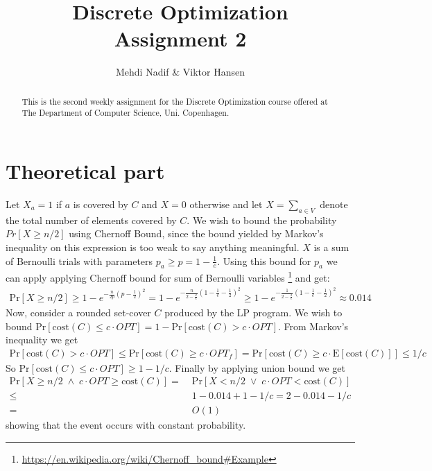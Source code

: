 \documentclass[12pt]{article}
\begin{document}
\nocite{*}


\title{Discrete Optimization \\
       Assignment 2}

\author{Mehdi Nadif \& Viktor Hansen}

\maketitle

\begin{abstract}
  This is the second weekly assignment for the Discrete Optimization course offered at The Department of Computer Science, Uni. Copenhagen.
\end{abstract}

\pagebreak

\section*{Theoretical part}
Let $X_a = 1$ if $a$ is covered by $C$ and $X=0$ otherwise and let $X=\sum_{a \in V}$ denote the total number of elements covered by $C$. We wish to bound the probability $Pr\left[ X \geq n/2 \right]$ using Chernoff Bound, since the bound yielded by Markov's inequality on this expression is too weak to say anything meaningful. $X$ is a sum of Bernoulli trials with parameters $p_a  \geq p =  1-\frac{1}{e}$. Using this bound for $p_a$ we can apply applying Chernoff bound for sum of Bernoulli variables \footnote{\url{https://en.wikipedia.org/wiki/Chernoff_bound\#Example}} and get:
\begin{align*}
\text{Pr}[X \geq n/2] \geq 1 - e^{-\frac{n}{2p}\left( p-\frac{1}{2} \right)^2} = 1 - e^{-\frac{n}{2-\frac{2}{e}}\left( 1-\frac{1}{e}-\frac{1}{2} \right)^2} \geq 1 - e^{-\frac{1}{2-\frac{2}{e}}\left( 1-\frac{1}{e}-\frac{1}{2} \right)^2} \approx 0.014
\end{align*}
Now, consider a rounded set-cover $C$ produced by the LP program. We wish to bound $\text{Pr}[\text{cost}(C) \leq c \cdot OPT ] = 1 - \text{Pr}[\text{cost}(C) > c \cdot OPT ] $. From Markov's inequality we get
\begin{align*}
\text{Pr}[\text{cost}(C) > c \cdot OPT ] \leq \text{Pr}[\text{cost}(C) \geq  c \cdot OPT_f ] = \text{Pr}[\text{cost}(C) \geq  c \cdot \text{E}[\text{cost}(C)] ] \leq 1/c
\end{align*}
So  $\text{Pr}[\text{cost}(C) \leq c \cdot OPT ] \geq 1-1/c$. Finally by applying union bound we get
\begin{align*}
\text{Pr}[X \geq n/2 \; \land \; c \cdot OPT \geq \text{cost}(C)] = & \; \text{Pr}[X < n/2 \; \lor \; c \cdot OPT < \text{cost}(C)] \\
\leq &\;1 - 0.014 + 1 - 1/c = 2 - 0.014-1/c\\
= & \; O(1)
\end{align*}
showing that the event occurs with constant probability.
\end{document}

